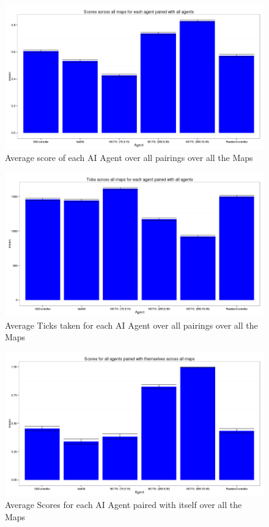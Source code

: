 \documentclass{IEEEtran}
\begin{document}
\begin{figure}[!t]
\centering
\includegraphics[width=\linewidth]{scores-allmaps}
\caption{Average score of each AI Agent over all pairings over all the Maps}
\label{avgScoreAllMaps}
\end{figure}

\begin{figure}[!t]
\centering
\includegraphics[width=\linewidth]{ticks-allmaps}
\caption{Average Ticks taken for each AI Agent over all pairings over all the Maps}
\label{avgTicksAllMaps}
\end{figure}

\begin{figure}[!t]
\centering
\includegraphics[width=\linewidth]{scores-samepairs}
\caption{Average Scores for each AI Agent paired with itself over all the Maps}
\label{avgScorePairAllMaps}
\end{figure}
\end{document}
